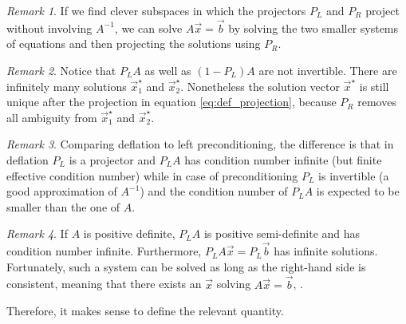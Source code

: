 \documentclass{article}
\theoremstyle{plain} %
\theoremstyle{convention} %
\theoremstyle{remark} %
\newtheorem*{remark}{Remark} %
\numberwithin{equation}{section}
\begin{document}
\begin{remark}
If we find clever subspaces in which the projectors $P_L$ and $P_R$ project without involving $A^{-1}$, we can solve $A\vec{x} = \vec{b}$ by solving the two smaller systems of equations and then projecting the solutions using $P_R$.
\end{remark}

\begin{remark}
Notice that $P_L A$ as well as $(1-P_L)A$ are not invertible. There are infinitely many solutions $\vec{x}^{\star}_1$ and $\vec{x}^{\star}_2$\footnotemark. Nonetheless the solution vector $\vec{x}^{\star}$ is still unique after the projection in equation \eqref{eq:def_projection}, because $P_R$ removes all ambiguity from $\vec{x}^{\star}_1$ and $\vec{x}^{\star}_2$.
\end{remark}


\begin{remark}
Comparing deflation to left preconditioning, the difference is that in deflation $P_L$ is a projector and $P_L A$ has condition number infinite (but finite effective condition number) while in case of preconditioning $P_L $ is invertible (a good approximation of $A^{-1}$) and the condition number of $P_L A$ is expected to be smaller than the one of $A$. 
\end{remark}

\begin{remark}
If $A$ is positive definite, $P_L A$ is positive semi-definite and has condition number infinite. Furthermore, $P_L A \vec{x} = P_L \vec{b}$ has infinite solutions. Fortunately, such a system can be solved as long as the right-hand side is consistent, meaning that there exists an $\vec{x}$ solving $A \vec{x} = \vec{b}$, \cite{kaasschieter1988}.
\end{remark}

Therefore, it makes sense to define the relevant quantity.
\end{document}
